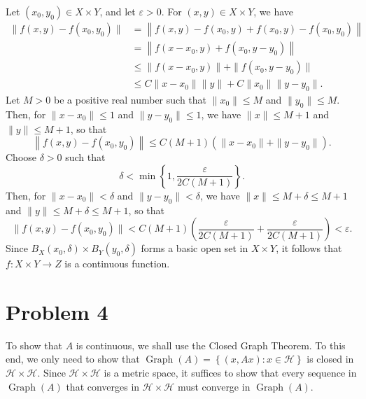 \documentclass[11pt]{article}
\theoremstyle{thmstyle}
\theoremstyle{defstyle}
\renewcommand{\le}{\leqslant}
\newcommand{\calH}{\mathcal{H}}
\begin{document}
Let $(x_0, y_0)\in X\times Y$, and let $\varepsilon > 0$. For $(x, y)\in X\times Y$, we have 
\begin{align*}
    \|f(x, y) - f(x_0, y_0)\| &= \left\|f(x, y) - f(x_0, y) + f(x_0, y) - f(x_0, y_0)\right\|\\ 
    &= \left\|f(x - x_0, y) + f(x_0, y - y_0)\right\|\\
    &\le \|f(x - x_0, y)\| + \|f(x_0, y - y_0)\|\\
    &\le C\|x - x_0\|\|y\| + C\|x_0\|\|y - y_0\|.
\end{align*}
Let $M > 0$ be a positive real number such that $\|x_0\|\le M$ and $\|y_0\|\le M$. Then, for $\|x - x_0\|\le 1$ and $\|y - y_0\|\le 1$, we have $\|x\|\le M + 1$ and $\|y\|\le M + 1$, so that 
\begin{equation*}
    \left\|f(x, y) - f(x_0, y_0)\right\|\le C(M + 1)\left(\|x - x_0\| + \|y - y_0\|\right).
\end{equation*}
Choose $\delta > 0$ such that 
\begin{equation*}
    \delta < \min\left\{1, \frac{\varepsilon}{2C(M + 1)}\right\}.
\end{equation*}
Then, for $\|x - x_0\| < \delta$ and $\|y - y_0\| < \delta$, we have $\|x\|\le M + \delta\le M + 1$ and $\|y\|\le M + \delta\le M + 1$, so that 
\begin{equation*}
    \|f(x, y) - f(x_0, y_0)\| < C(M + 1)\left(\frac{\varepsilon}{2C(M + 1)} + \frac{\varepsilon}{2C(M + 1)}\right) < \varepsilon.
\end{equation*}
Since $B_X(x_0, \delta)\times B_Y(y_0, \delta)$ forms a basic open set in $X\times Y$, it follows that $f\colon X\times Y\to Z$ is a continuous function.

\section{Problem 4}

To show that $A$ is continuous, we shall use the Closed Graph Theorem. To this end, we only need to show that $\operatorname{Graph}(A) = \left\{(x, Ax)\colon x\in\calH\right\}$ is closed in $\calH\times\calH$. Since $\calH\times\calH$ is a metric space, it suffices to show that every sequence in $\operatorname{Graph}(A)$ that converges in $\calH\times\calH$ must converge in $\operatorname{Graph}(A)$.
\end{document}
